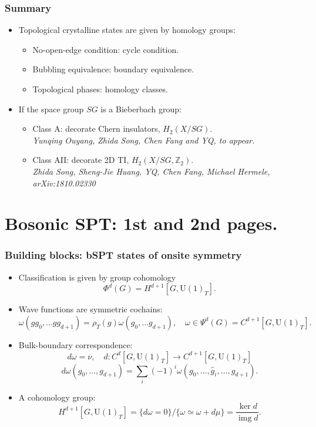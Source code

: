 \documentclass[xcolor=table, 10pt, aspectratio=43]{beamer}
\newcommand{\uone}{\mathrm U(1)}
\DeclareMathOperator{\img}{img}
\begin{document}
\begin{frame}
\frametitle{Summary}
\begin{itemize}
\item Topological crystalline states are given by homology groups:
\begin{itemize}
\item No-open-edge condition: cycle condition.
\item Bubbling equivalence: boundary equivalence.
\item Topological phases: homology classes.
\end{itemize}
\item If the space group $SG$ is a Bieberbach group:
\begin{itemize}
	\item Class A: decorate Chern insulators, $H_2(X/SG)$.\\
	\emph{Yunqing Ouyang, Zhida Song, Chen Fang and YQ, to appear.}
	\item Class AII: decorate 2D TI, $H_2(X/SG, \mathbb Z_2)$.\\
	\emph{Zhida Song, Sheng-Jie Huang, YQ, Chen Fang, Michael Hermele, arXiv:1810.02330}
\end{itemize}
\end{itemize}
\end{frame}

\section{Bosonic SPT: 1st and 2nd pages.}

\begin{frame}
  \frametitle{Building blocks: bSPT states of onsite symmetry}
  \begin{itemize}
    \item Classification is given by group cohomology
    \[\Phi^d(G) = H^{d+1}[G, \uone_T].\]
		\item Wave functions are symmetric cochains:
		\[\omega(gg_0,\ldots gg_{d+1})=\rho_T(g)\omega(g_0,\ldots g_{d+1}),\quad
		\omega\in\Psi^d(G) = C^{d+1}[G, \uone_T].\]
		\item Bulk-boundary correspondence:
		\[d\omega = \nu,\quad d:C^d[G, \uone_T]\rightarrow C^{d+1}[G, \uone_T]\]
		\[d\omega(g_0,\ldots,g_{d+1})
		=\sum_i(-1)^i\omega(g_0,\ldots,\hat g_i,\ldots,g_{d+1}).\]
\begin{center}
\end{center}
  \item A cohomology group:
\[H^{d+1}[G,\uone_T]=\{d\omega=0\}/\{\omega\simeq\omega+d\mu\}=\frac{\ker d}{\img d}.\]
  \end{itemize}
\end{frame}
\end{document}
